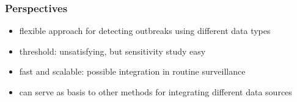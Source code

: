 \documentclass[Xcolor=svgnames,mathserif]{beamer}
\begin{document}
\begin{frame}[fragile]
  \frametitle{Perspectives}

  \begin{itemize}
  \item \alert{flexible} approach for detecting outbreaks using different data types
    \pause
    \vspace{.25cm}
  \item \alert{threshold}: unsatisfying, but sensitivity study easy
    \pause
    \vspace{.25cm}
  \item \alert{fast and scalable}: possible integration in routine surveillance
    \pause
    \vspace{.25cm}
  \item can serve as \alert{basis to other methods} for integrating different data sources
  \end{itemize}

\end{frame}
\end{document}
